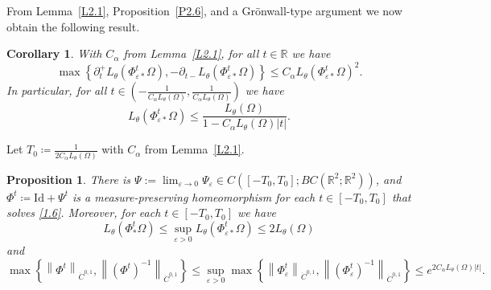 \documentclass[reqno,centertags,12pt]{amsart}
\newtheorem{proposition}[theorem]{Proposition}
\newtheorem{corollary}[theorem]{Corollary}
\theoremstyle{definition}
\numberwithin{equation}{section}
\newcommand{\abs}[1]{\left\lvert#1\right\rvert}
\newcommand{\norm}[1]{\left\|#1\right\|}
\newcommand{\set}[1]{\left\{ #1 \right\}}
\newcommand{\bbR}{{\mathbb{R}}}
\newcommand{\eps}{\varepsilon}
\newcommand{\tht}{\theta}
\begin{document}
From Lemma~\ref{L2.1}, Proposition~\ref{P2.6}, and  a Gr\"{o}nwall-type argument we now obtain the following result.

\begin{corollary}\label{C2.7}
    With $C_{\alpha}$ from Lemma~\ref{L2.1}, for all $t\in\bbR$ we have
    \[
        \max\set{
            \partial_{t}^{+}L_{\tht}(\Phi_{\eps*}^{t}\Omega),
            -\partial_{t-}L_{\tht}(\Phi_{\eps*}^{t}\Omega)
        }
        \leq C_{\alpha}L_{\tht}(\Phi_{\eps*}^{t}\Omega)^{2}.
    \]
    In particular, for all  $t\in(- \frac{1}{C_{\alpha}L_{\tht}(\Omega)},
    \frac{1}{C_{\alpha}L_{\tht}(\Omega)})$ we have
    \[
        L_{\tht}(\Phi_{\eps*}^{t}\Omega)
        \leq \frac{L_{\tht}(\Omega)}{1 - C_{\alpha}L_{\tht}(\Omega)\abs{t}}.
    \]
\end{corollary}


Let $T_{0}\coloneqq \frac{1}{2C_{\alpha}L_{\tht}(\Omega)}$ with $C_{\alpha}$ from Lemma~\ref{L2.1}.

\begin{proposition}\label{P2.8}
    There is $\Psi:=\lim_{\eps\to 0} \Psi_{\eps}\in C\left([-T_{0},T_{0}];BC(\bbR^{2};\bbR^{2})\right)$,
    and $\Phi^{t}\coloneqq\mathrm{Id} + \Psi^{t}$
    is a measure-preserving homeomorphism for each $t\in[-T_{0},T_{0}]$ that solves \eqref{1.6}. Moreover, for each $t\in[-T_{0},T_{0}]$ we have 
    \[
        L_{\tht}(\Phi_{*}^{t}\Omega) \leq
        \sup_{\eps>0}L_{\tht}(\Phi_{\eps*}^{t}\Omega) \leq 2L_{\tht}(\Omega)
    \]
    and
    \[
        \max\set{\norm{\Phi^{t}}_{\dot{C}^{0,1}}, \norm{(\Phi^{t})^{-1}}_{\dot{C}^{0,1}}}
        \leq \sup_{\eps>0}\max\set{
            \norm{\Phi_{\eps}^{t}}_{\dot{C}^{0,1}},
            \norm{(\Phi_{\eps}^{t})^{-1}}_{\dot{C}^{0,1}}
        }
        \leq e^{2C_{\alpha}L_{\tht}(\Omega)\abs{t}}.
    \]
\end{proposition}
\end{document}
